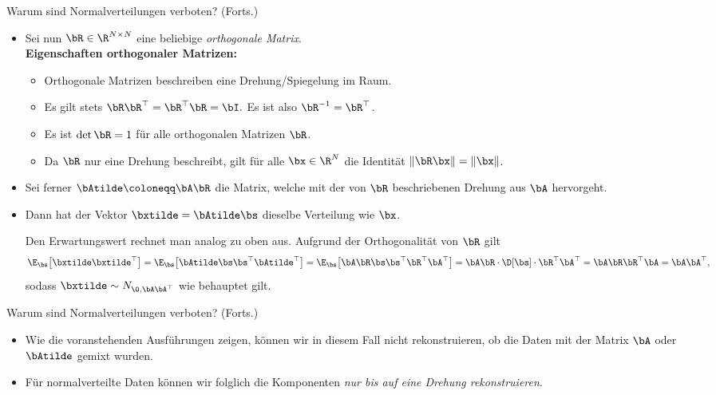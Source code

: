 \begin{frame}{Warum sind Normalverteilungen verboten? (Forts.)}{}
	\begin{itemize}
		\item Sei nun $\bR \in \R^{N \times N}$ eine beliebige \textit{orthogonale Matrix}. \\ \vspace*{2mm}
		\textbf{Eigenschaften orthogonaler Matrizen:}
		\begin{itemize}
			\item Orthogonale Matrizen beschreiben eine Drehung/Spiegelung im Raum.
			\item Es gilt stets $\bR \bR^\top = \bR^\top \bR = \bI.$ Es ist also $\bR^{-1} = \bR^\top$.
			\item Es ist $\det \bR = 1$ für alle orthogonalen Matrizen $\bR$.
			\item Da $\bR$ nur eine Drehung beschreibt, gilt für alle $\bx \in \R^N$ die Identität
				$\Vert \bR \bx \Vert = \Vert \bx \Vert$.
		\end{itemize}
		\item Sei ferner $\bAtilde \coloneqq \bA \bR$ die Matrix, welche mit der von $\bR$ beschriebenen Drehung
			aus $\bA$ hervorgeht.
		\item Dann hat der Vektor $\bxtilde = \bAtilde \bs$ dieselbe Verteilung wie $\bx$. \\ \vspace*{2mm}
		\begin{myproof}
			Den Erwartungswert rechnet man analog zu oben aus. Aufgrund der Orthogonalität von $\bR$ gilt
			\begin{equation*}
				\E_{\bs}\bigl[ \bxtilde \bxtilde^\top \bigr]
					= \E_{\bs}\bigl[ \bAtilde \bs \bs^\top \bAtilde^\top \bigr]
					= \E_{\bs}\bigl[ \bA \bR \bs \bs^\top \bR^\top \bA^\top \bigr]
					= \bA \bR \cdot \D[\bs] \cdot \bR^\top \bA^\top
					= \bA \bR \bR^\top \bA
					= \bA \bA^\top,
			\end{equation*}
			sodass $\bxtilde \sim N_{\0, \bA \bA^\top}$ wie behauptet gilt.
		\end{myproof}
	\end{itemize}
\end{frame}


\begin{frame}{Warum sind Normalverteilungen verboten? (Forts.)}{}
	\begin{itemize}
		\item Wie die voranstehenden Ausführungen zeigen, können wir in diesem Fall nicht rekonstruieren,
			ob die Daten mit der Matrix $\bA$ oder $\bAtilde$ gemixt wurden.
		\item Für normalverteilte Daten können wir folglich die Komponenten \textit{nur bis auf eine Drehung rekonstruieren}.
	\end{itemize}
\end{frame}


